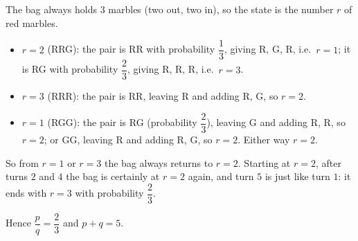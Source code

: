 The bag always holds $3$ marbles (two out, two in), so the state is the number $r$ of red marbles.
\begin{itemize}
\item $r=2$ (RRG): the pair is RR with probability $\dfrac{1}{3}$, giving R, G, R, i.e.\ $r=1$; it is RG with probability $\dfrac{2}{3}$, giving R, R, R, i.e.\ $r=3$.
\item $r=3$ (RRR): the pair is RR, leaving R and adding R, G, so $r=2$.
\item $r=1$ (RGG): the pair is RG (probability $\dfrac{2}{3}$), leaving G and adding R, R, so $r=2$; or GG, leaving R and adding R, G, so $r=2$. Either way $r=2$.
\end{itemize}
So from $r=1$ or $r=3$ the bag always returns to $r=2$. Starting at $r=2$, after turns $2$ and $4$ the bag is certainly at $r=2$ again, and turn $5$ is just like turn $1$: it ends with $r=3$ with probability $\dfrac{2}{3}$.

Hence $\dfrac {p}{q}=\dfrac{2}{3}$ and $p+q=\boxed{5}$.
